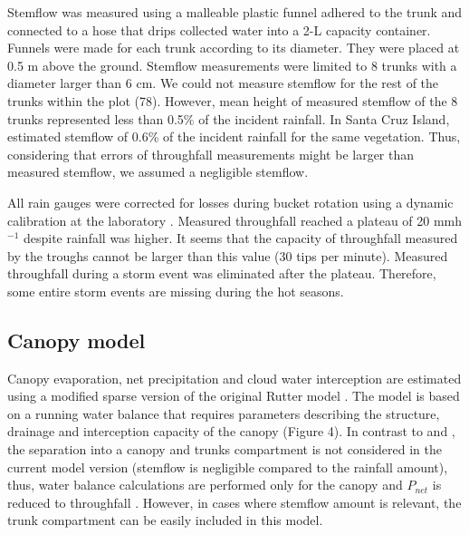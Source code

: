 \documentclass[a4paper,12pt]{article}
\begin{document}
Stemflow was measured using a malleable plastic funnel adhered to the trunk and connected to a hose that drips collected water into a 2-L capacity container. Funnels were made for each trunk according to its diameter. They were placed at 0.5 m above the ground. Stemflow measurements were limited to 8 trunks with a diameter larger than 6 cm. We could not measure stemflow for the rest of the trunks within the plot (78). However, mean height of measured stemflow of the 8 trunks represented less than 0.5\% of the incident rainfall. In Santa Cruz Island, \cite{Pryetetal2012a} estimated stemflow of 0.6\% of the incident rainfall for the same vegetation. Thus, considering that errors of throughfall measurements might be larger than measured stemflow, we assumed a negligible stemflow.

All rain gauges were corrected for losses during bucket rotation using a dynamic calibration at the laboratory \citep{CalderandKidd1978}. Measured throughfall reached a plateau of 20 mmh$^{-1}$ despite rainfall was higher. It seems that the capacity of throughfall measured by the troughs cannot be larger than this value (30 tips per minute). Measured throughfall during a storm event was eliminated after the plateau. Therefore, some entire storm events are missing during the hot seasons. 

\subsection{Canopy model}
Canopy evaporation, net precipitation and cloud water interception are estimated using a modified sparse version of the original Rutter model \citep{Rutter1971, Rutter1975}. The model is based on a running water balance that requires parameters describing the structure, drainage and interception capacity of the canopy (Figure 4). In contrast to \cite{Rutter1975} and \cite{Valenteetal1997}, the separation into a canopy and trunks compartment is not considered in the current model version (stemflow is negligible compared to the rainfall amount), thus, water balance calculations are performed only for the canopy and $P_{net}$ is reduced to throughfall \citep{Pryetetal2012a}. However, in cases where stemflow amount is relevant, the trunk compartment can be easily included in this model.
\end{document}

